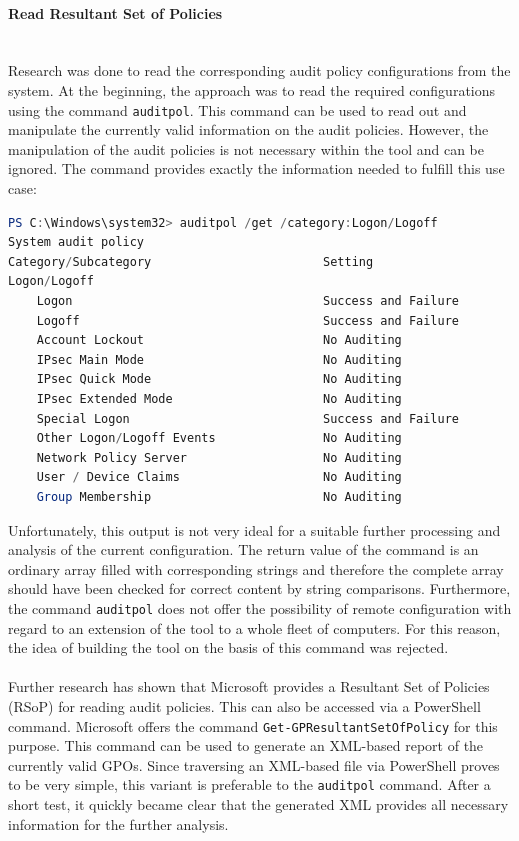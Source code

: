 \paragraph{Read Resultant Set of Policies} \ \\
Research was done to read the corresponding audit policy configurations from the system. At the beginning, the approach was to read the required configurations using the command \lstinline|auditpol|. \cite{auditpol} This command can be used to read out and manipulate the currently valid information on the audit policies. However, the manipulation of the audit policies is not necessary within the tool and can be ignored. The command provides exactly the information needed to fulfill this use case:
\begin{lstlisting}[caption=auditpol, language=PowerShell]
PS C:\Windows\system32> auditpol /get /category:Logon/Logoff
System audit policy
Category/Subcategory                        Setting
Logon/Logoff
    Logon                                   Success and Failure
    Logoff                                  Success and Failure
    Account Lockout                         No Auditing
    IPsec Main Mode                         No Auditing
    IPsec Quick Mode                        No Auditing
    IPsec Extended Mode                     No Auditing
    Special Logon                           Success and Failure
    Other Logon/Logoff Events               No Auditing
    Network Policy Server                   No Auditing
    User / Device Claims                    No Auditing
    Group Membership                        No Auditing
\end{lstlisting}
Unfortunately, this output is not very ideal for a suitable further processing and analysis of the current configuration. The return value of the command is an ordinary array filled with corresponding strings and therefore the complete array should have been checked for correct content by string comparisons. Furthermore, the command \lstinline|auditpol| does not offer the possibility of remote configuration with regard to an extension of the tool to a whole fleet of computers. For this reason, the idea of building the tool on the basis of this command was rejected.
\\\\
Further research has shown that Microsoft provides a Resultant Set of Policies (RSoP) \cite{RSoP} for reading audit policies. This can also be accessed via a PowerShell command. Microsoft offers the command \lstinline|Get-GPResultantSetOfPolicy| \cite{GetGPResultantSetOfPolicy} for this purpose. This command can be used to generate an XML-based report of the currently valid GPOs. Since traversing an XML-based file via PowerShell proves to be very simple, this variant is preferable to the \lstinline|auditpol| command. After a short test, it quickly became clear that the generated XML provides all necessary information for the further analysis.


